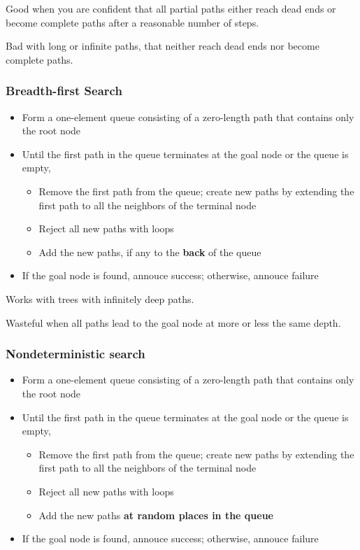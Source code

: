 \documentclass{article}
\begin{document}
Good when you are confident that all partial paths either reach dead ends
or become complete paths after a reasonable number of steps.

Bad with long or infinite paths, that neither reach dead ends 
nor become complete paths.

\subsubsection{Breadth-first Search}

\begin{itemize}
  \item Form a one-element queue consisting of a zero-length path
    that contains only the root node
  \item Until the first path in the queue terminates at the goal node 
    or the queue is empty,
    \begin{itemize}
      \item Remove the first path from the queue; create new paths
        by extending the first path to all the neighbors of the 
        terminal node
      \item Reject all new paths with loops
      \item Add the new paths, if any to the \textbf{back} of the queue
    \end{itemize}
  \item If the goal node is found, annouce success; otherwise, annouce 
    failure
\end{itemize}


Works with trees with infinitely deep paths.

Wasteful when all paths lead to the goal node at more or less the same depth.

\subsubsection{Nondeterministic search}

\begin{itemize}
  \item Form a one-element queue consisting of a zero-length path
    that contains only the root node
  \item Until the first path in the queue terminates at the goal node 
    or the queue is empty,
    \begin{itemize}
      \item Remove the first path from the queue; create new paths
        by extending the first path to all the neighbors of the 
        terminal node
      \item Reject all new paths with loops
      \item Add the new paths \textbf{at random places in the queue}
    \end{itemize}
  \item If the goal node is found, annouce success; otherwise, annouce 
    failure
\end{itemize}
\end{document}
